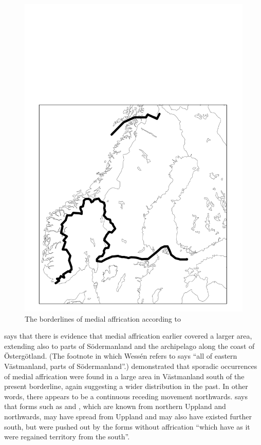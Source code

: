 \begin{figure}[h]
 
\includegraphics[height=.5\textheight]{figures/26_BorderlinesofMedAf}
\caption{The borderlines of medial affrication according to \citet{Haugen1970}}
\label{map:22}

 
\end{figure}

\citet[43]{Wessén1966} says that there is evidence that medial affrication earlier covered a larger area, extending also to parts of Södermanland and the archipelago along the coast of Östergötland. (The footnote in \citet[36]{Hesselman1905} which Wessén refers to says “all of eastern Västmanland, parts of Södermanland”.) \citet{GeijerEtAl1930} demonstrated that sporadic occurrences of medial affrication were found in a large area in Västmanland south of the present borderline, again suggesting a wider distribution in the past. In other words, there appears to be a continuous receding movement northwards. \citet[80]{Reinhammar2005} says that forms such as  and , which are known from northern Uppland and northwards, may have spread from Uppland and may also have existed further south, but were pushed out by the forms without affrication “which have as it were regained territory from the south”.

